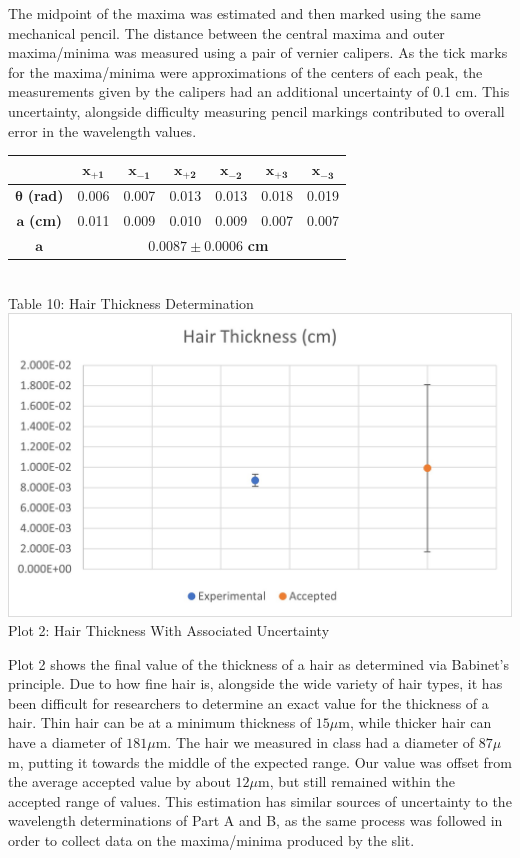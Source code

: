 The midpoint of the maxima was estimated and then marked using the same mechanical pencil.
The distance between the central maxima and outer maxima/minima was measured using a pair of vernier calipers. 
As the tick marks for the maxima/minima were approximations of the centers of each peak, the measurements given by the calipers had an additional uncertainty of 0.1 cm.
This uncertainty, alongside difficulty measuring pencil markings contributed to overall error in the wavelength values.
\begin{center}
    \begin{tabular}{|c|c|c|c|c|c|c|}
        \hline
        & $\bm{x_{+1}}$ &$\bm{x_{-1}}$ & $\bm{x_{+2}}$ & $\bm{x_{-2}}$ & $\bm{x_{+3}}$ & $\bm{x_{-3}}$  \\ \hline
        $\bm{\theta}$ \textbf{(rad)} & 0.006 & 0.007 & 0.013 & 0.013 & 0.018 & 0.019\\
        $\bm{a}$ \textbf{(cm)}       & 0.011 & 0.009 & 0.010 & 0.009 & 0.007 & 0.007 \\ \hline
        $\bm{a}$ & \multicolumn{6}{|c|}{$0.0087\pm0.0006$ \textbf{ cm}}\\\hline
    \end{tabular} 
    \vspace{3mm}
    \\ Table 10: Hair Thickness Determination\\
    \vspace{5mm}
    \includegraphics*[]{Hair Thickness.jpg}
    \\Plot 2: Hair Thickness With Associated Uncertainty
\end{center}
Plot 2 shows the final value of the thickness of a hair as determined via Babinet's principle. 
Due to how fine hair is, alongside the wide variety of hair types, it has been difficult for researchers to determine an exact value for the thickness of a hair.
Thin hair can be at a minimum thickness of $15 \mu$m, while thicker hair can have a diameter of $181 \mu$m. 
The hair we measured in class had a diameter of $87 \mu$m, putting it towards the middle of the expected range. 
Our value was offset from the average accepted value by about $12 \mu$m, but still remained within the accepted range of values.
This estimation has similar sources of uncertainty to the wavelength determinations of Part A and B, as the same process was followed in order to collect data on the maxima/minima produced by the slit.
